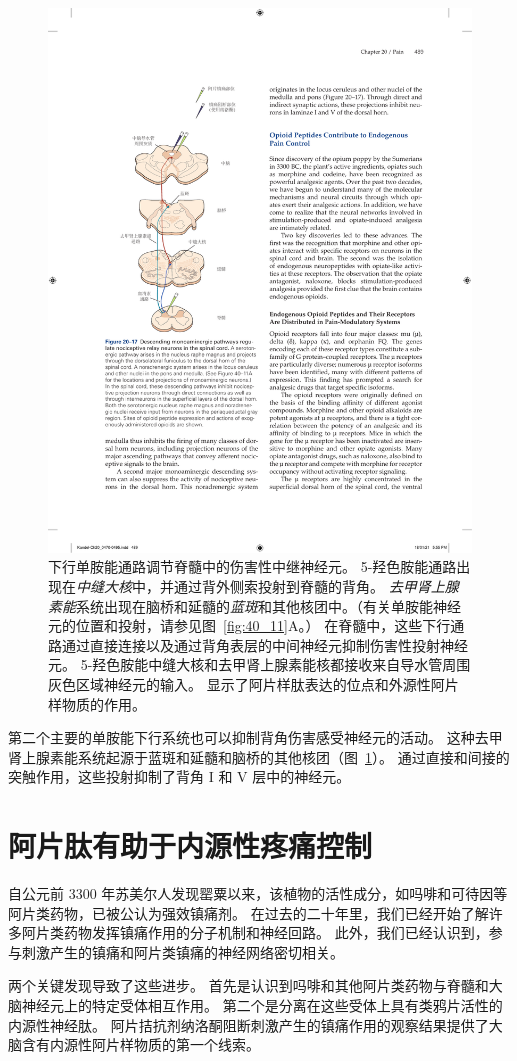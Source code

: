 \begin{figure}[htbp]
	\centering
	\includegraphics[width=0.65\linewidth]{chap20/fig_20_17}
	\caption{下行单胺能通路调节脊髓中的伤害性中继神经元。
		5-羟色胺能通路出现在\textit{中缝大核}中，并通过背外侧索投射到脊髓的背角。
		\textit{去甲肾上腺素能}系统出现在脑桥和延髓的\textit{蓝斑}和其他核团中。（有关单胺能神经元的位置和投射，请参见图~\ref{fig:40_11}A。）
		在脊髓中，这些下行通路通过直接连接以及通过背角表层的中间神经元抑制伤害性投射神经元。
		5-羟色胺能中缝大核和去甲肾上腺素能核都接收来自导水管周围灰色区域神经元的输入。
		显示了阿片样肽表达的位点和外源性阿片样物质的作用。}
	\label{fig:20_17}
\end{figure}


第二个主要的单胺能下行系统也可以抑制背角伤害感受神经元的活动。
这种去甲肾上腺素能系统起源于蓝斑和延髓和脑桥的其他核团（图~\ref{fig:20_17}）。
通过直接和间接的突触作用，这些投射抑制了背角 I 和 V 层中的神经元。



\section{阿片肽有助于内源性疼痛控制}

自公元前 3300 年苏美尔人发现罂粟以来，该植物的活性成分，如吗啡和可待因等阿片类药物，已被公认为强效镇痛剂。
在过去的二十年里，我们已经开始了解许多阿片类药物发挥镇痛作用的分子机制和神经回路。
此外，我们已经认识到，参与刺激产生的镇痛和阿片类镇痛的神经网络密切相关。


两个关键发现导致了这些进步。
首先是认识到吗啡和其他阿片类药物与脊髓和大脑神经元上的特定受体相互作用。
第二个是分离在这些受体上具有类鸦片活性的内源性神经肽。
阿片拮抗剂纳洛酮阻断刺激产生的镇痛作用的观察结果提供了大脑含有内源性阿片样物质的第一个线索。



